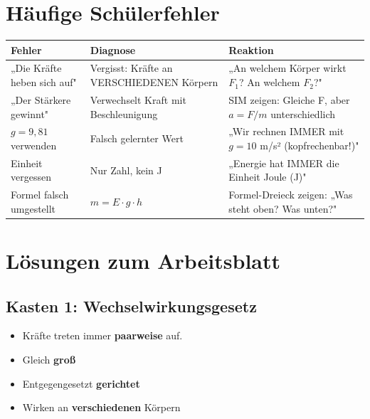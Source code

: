 \documentclass[11pt, a4paper]{article}
\newcommand{\lsg}[1]{\textcolor{loesung}{\textbf{#1}}}
\begin{document}

\section*{Häufige Schülerfehler}

\begin{tabularx}{\textwidth}{@{}l|X|X@{}}
\toprule
\textbf{Fehler} & \textbf{Diagnose} & \textbf{Reaktion} \\
\midrule
„Die Kräfte heben sich auf" & Vergisst: Kräfte an VERSCHIEDENEN Körpern & „An welchem Körper wirkt $F_1$? An welchem $F_2$?" \\
\midrule
„Der Stärkere gewinnt" & Verwechselt Kraft mit Beschleunigung & SIM zeigen: Gleiche F, aber $a = F/m$ unterschiedlich \\
\midrule
$g = 9{,}81$ verwenden & Falsch gelernter Wert & „Wir rechnen IMMER mit $g = 10$ m/s² (kopfrechenbar!)" \\
\midrule
Einheit vergessen & Nur Zahl, kein J & „Energie hat IMMER die Einheit Joule (J)" \\
\midrule
Formel falsch umgestellt & $m = E \cdot g \cdot h$ & Formel-Dreieck zeigen: „Was steht oben? Was unten?" \\
\bottomrule
\end{tabularx}


\newpage
\section*{Lösungen zum Arbeitsblatt}

\subsection*{Kasten 1: Wechselwirkungsgesetz}

\begin{itemize}[leftmargin=2em]
    \item Kräfte treten immer \lsg{paarweise} auf.
    \item Gleich \lsg{groß}
    \item Entgegengesetzt \lsg{gerichtet}
    \item Wirken an \lsg{verschiedenen} Körpern
\end{itemize}
\end{document}
